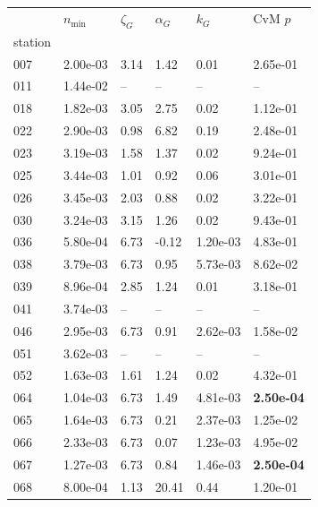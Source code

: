 \begin{figure}[htbp!]
    \centering
    {\footnotesize
    \begin{minipage}[t]{0.48\linewidth}
        \centering
        \begin{tabular}{llllll}
        \toprule
         & $n_{\min}$ & $\zeta_G$ & $\alpha_G$ & $k_G$ & CvM $p$ \\
        station &  &  &  &  &  \\
        \midrule
                    007 & 2.00e-03 & 3.14 & 1.42 & 0.01 & 2.65e-01\\
                    011 & 1.44e-02 & -- & -- & -- & --\\
                    018 & 1.82e-03 & 3.05 & 2.75 & 0.02 & 1.12e-01\\
                    022 & 2.90e-03 & 0.98 & 6.82 & 0.19 & 2.48e-01\\
                    023 & 3.19e-03 & 1.58 & 1.37 & 0.02 & 9.24e-01\\
                    025 & 3.44e-03 & 1.01 & 0.92 & 0.06 & 3.01e-01\\
                    026 & 3.45e-03 & 2.03 & 0.88 & 0.02 & 3.22e-01\\
                    030 & 3.24e-03 & 3.15 & 1.26 & 0.02 & 9.43e-01\\
                    036 & 5.80e-04 & 6.73 & -0.12 & 1.20e-03 & 4.83e-01\\
                    038 & 3.79e-03 & 6.73 & 0.95 & 5.73e-03 & 8.62e-02\\
                    039 & 8.96e-04 & 2.85 & 1.24 & 0.01 & 3.18e-01\\
                    041 & 3.74e-03 & -- & -- & -- & --\\
                    046 & 2.95e-03 & 6.73 & 0.91 & 2.62e-03 & 1.58e-02\\
                    051 & 3.62e-03 & -- & -- & -- & --\\
                    052 & 1.63e-03 & 1.61 & 1.24 & 0.02 & 4.32e-01\\
                    064 & 1.04e-03 & 6.73 & 1.49 & 4.81e-03 & \textbf{2.50e-04}\\
                    065 & 1.64e-03 & 6.73 & 0.21 & 2.37e-03 & 1.25e-02\\
                    066 & 2.33e-03 & 6.73 & 0.07 & 1.23e-03 & 4.95e-02\\
                    067 & 1.27e-03 & 6.73 & 0.84 & 1.46e-03 & \textbf{2.50e-04}\\
                    068 & 8.00e-04 & 1.13 & 20.41 & 0.44 & 1.20e-01\\

\end{tabular}
\end{minipage}}
\end{figure}
